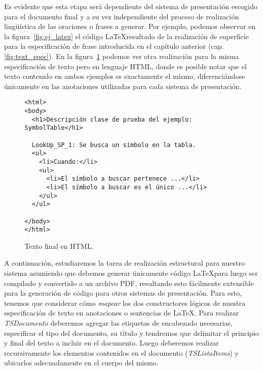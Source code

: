 Es evidente que esta etapa será dependiente del sistema de presentación escogido para el documento final y a su vez independiente del proceso de realización lingüística de las oraciones o frases a generar.  Por ejemplo, podemos observar en la figura~\ref{fig:ej_latex} el código \LaTeX resultado de la realización de superficie para la especificación de frase introducida en el capítulo anterior (cap. \ref{fig:text_spec}). En la figura~\ref{fig:ej_html} podemos ver otra realización para la misma especificación de texto pero en lenguaje HTML, donde es posible notar que el texto contenido en ambos ejemplos es exactamente el mismo, diferenciándose únicamente en las anotaciones utilizadas para cada sistema de presentación.

\begin{figure}[H]
  \begin{verbatim}
<html>
<body>
  <h1>Descripción clase de prueba del ejemplo: SymbolTable</h1>

  LookUp_SP_1: Se busca un símbolo en la tabla.  
  <ul>
    <li>Cuando:</li>
    <ul>
      <li>El símbolo a buscar pertenece ...</li>
      <li>El símbolo a buscar es el único ...</li>
    </ul>
  </ul>

</body>
</html>
  \end{verbatim}
  \caption{Texto final en HTML.}
  \label{fig:ej_html}
\end{figure}


A continuación, estudiaremos la tarea de realización estructural para nuestro sistema asumiendo que debemos generar únicamente código \LaTeX para luego ser compilado y convertido a un archivo PDF, resultando esto fácilmente extensible para la generación de código para otros sistemas de presentación. Para esto, tenemos que considerar cómo \emph{mapear} los dos constructores lógicos de nuestra especificación de texto en anotaciones o sentencias de \LaTeX. Para realizar \emph{TSDocumento} deberemos agregar las etiquetas de encabezado necesarias, especificar el tipo del documento, su título y tendremos que delimitar el principio y final del texto a incluir en el documento. Luego deberemos realizar recursivamente los elementos contenidos en el documento (\emph{TSListaItems}) y ubicarlos adecuadamente en el cuerpo del mismo.

